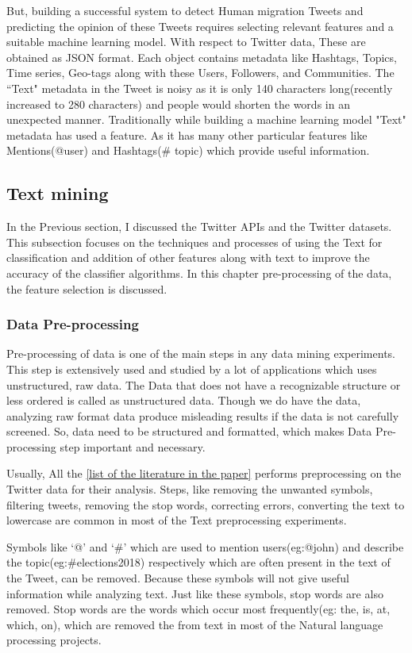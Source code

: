  But, building a successful system to detect Human migration Tweets and predicting the opinion of these Tweets requires selecting relevant features and a suitable machine learning model. With respect to Twitter data, These are obtained as JSON format. Each object contains metadata like Hashtags, Topics, Time series, Geo-tags along with these Users, Followers, and Communities. The ``Text" metadata in the Tweet is noisy as it is only 140 characters long(recently increased to 280 characters) and people would shorten the words in an unexpected manner. Traditionally while building a machine learning model "Text" metadata has used a feature. As it has many other particular features like Mentions(@user) and Hashtags(\# topic) which provide useful information.
 
 
\subsection{Text mining}

In the Previous section, I discussed the Twitter APIs and the Twitter datasets. This subsection focuses on the techniques and processes of using the Text for classification and addition of other features along with text to improve the accuracy of the classifier algorithms.  In this chapter pre-processing of the data, the feature selection is discussed.

\subsubsection{Data Pre-processing}

Pre-processing of data is one of the main steps in any data mining experiments. This step is extensively used and studied by a lot of applications which uses unstructured, raw data. The Data that does not have a recognizable structure or less ordered is called as unstructured data.  Though we do have the data, analyzing raw format data produce misleading results if the data is not carefully screened. So, data need to be structured and formatted, which makes Data Pre-processing step important and necessary.

Usually, All the \underline{[list of the literature in the paper]} performs preprocessing on the Twitter data for their analysis. Steps,  like removing the unwanted symbols, filtering tweets, removing the stop words,  correcting errors, converting the text to lowercase are common in most of the Text preprocessing experiments.

Symbols like `@' and `\#' which are used to mention users(eg:@john) and describe the topic(eg:\#elections2018) respectively which are often present in the text of the Tweet, can be removed. Because these symbols will not give useful information while analyzing text. Just like these symbols, stop words are also removed. Stop words are the words which occur most frequently(eg: the, is, at, which, on), which are removed the from text in most of the Natural language processing projects. 

